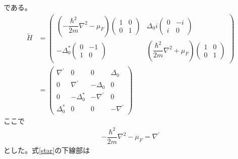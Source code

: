 \documentclass{jarticle}
\begin{document}
  である。
    \begin{align}
  \tilde{H}&=
       \begin{pmatrix}
  (-\dfrac{\hbar^2}{2m}\nabla^2-\mu_F)\begin{pmatrix}
  1 & 0 \\
  0 & 1
  \end{pmatrix} & \Delta_0i \begin{pmatrix}
  0 & -i \\
  i & 0
  \end{pmatrix} \\
  -\Delta^{*}_0\begin{pmatrix}
  0 & -1 \\
  1& 0
  \end{pmatrix} & (\dfrac{\hbar^2}{2m}\nabla^2+\mu_F)\begin{pmatrix}
  1 & 0 \\
  0 & 1
  \end{pmatrix}
  \end{pmatrix}
  \\&=\begin{pmatrix}
  \nabla^{'} & 0 & 0 & \Delta_0 \\ 
  0 & \nabla^{'} & -\Delta_0 & 0 \\ 
  0 & -\Delta^{*}_0 & -\nabla^{'} & 0 \\ 
  \Delta^{*}_0 & 0 & 0 & -\nabla^{'}
  \end{pmatrix} 
  \end{align}
  ここで
  \begin{align}
  -\dfrac{\hbar^2}{2m}\nabla^2-\mu_F=\nabla^{'}
  \end{align}
  とした。式\ref{star}の下線部は
\end{document}
